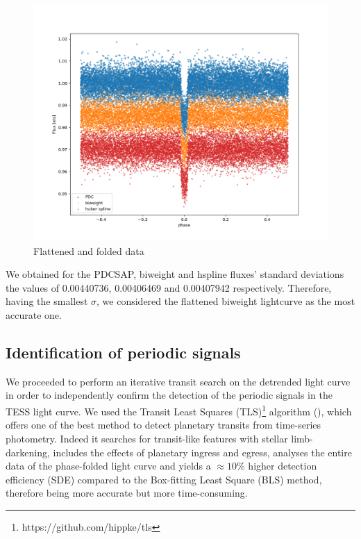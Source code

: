 \documentclass[a4paper,11pt,twocolumn]{article}
\begin{document}
\begin{figure}
    \includegraphics[scale=0.18, angle=0]{../pictures/tess/phase.png}
    \caption{Flattened and folded data}
   \label{fig:Transits}
\end{figure}


We obtained for the PDCSAP, biweight and hspline fluxes' standard deviations the values of 0.00440736, 0.00406469 and 
0.00407942 respectively. Therefore, having the smallest $\sigma$, we considered the flattened biweight lightcurve as the most accurate one.

\subsection{Identification of periodic signals}

We proceeded to perform an iterative  transit search on the detrended light curve in order to independently 
confirm the detection of the periodic signals in the TESS light curve.
We used  the Transit Least Squares (TLS)\footnote{https://github.com/hippke/tls} algorithm (\cite{Hippke2}), 
which offers one of the best method to detect planetary transits from time-series photometry.
Indeed it searches for transit-like features with stellar limb-darkening, includes the effects of planetary 
ingress and egress, analyses the entire data of the phase-folded light curve and yields a $\approx 10 \% $ higher 
detection efficiency (SDE) compared to the Box-fitting Least Square (BLS) method, therefore being more accurate but more time-consuming. 
\end{document}
